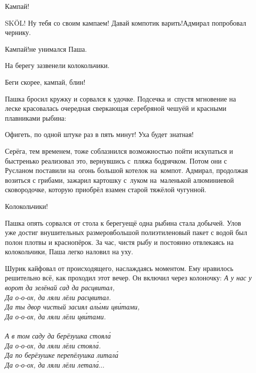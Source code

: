 \diagdash Кампай!

\diagdash SK{\"O}L! Ну тебя со своим кампаем! Давай компотик варить!\mdash Адмирал попробовал чернику.

\diagdash Кампай!\mdash не унимался Паша.

На берегу зазвенели колокольчики.

\diagdash Беги скорее, кампай, блин!

Пашка бросил кружку и сорвался к удочке. Подсечка и~спустя мгновение на леске красовалась очередная сверкающая серебряной чешуёй и красными плавниками рыбина:

\diagdash Офигеть, по одной штуке раз в пять минут! Уха будет знатная!

Серёга, тем временем, тоже соблазнился возможностью пойти искупаться и быстренько реализовал это, вернувшись с~пляжа бодрячком. Потом они с Русланом поставили на~огонь большой котелок на~компот. Адмирал, продолжая возиться с грибами, зажарил картошку с~луком на~маленькой алюминиевой сковородочке, которую приобрёл взамен старой тяжёлой чугунной. 

\diagdash Колокольчики!

Пашка опять сорвался от стола к берегу\mdash ещё одна рыбина стала добычей. Улов уже достиг внушительных размеров\mdash большой полиэтиленовый пакет с водой был полон плотвы и краснопёрок. За час, чистя рыбу и постоянно отвлекаясь на колокольчики, Паша легко наловил на уху.

Шурик кайфовал от происходящего, наслаждаясь моментом. Ему нравилось решительно всё, как проходил этот вечер. Он включил через колоночку:
\newpage
\vspace{0.2cm}
\noindent\textit{%
	\hspace*{1.5cm}А у нас у ворот да зелёнай сад да расцвитал,\\
	\hspace*{1.5cm}Да о-о-ох, да ляли лёли расцвитал.\\
	\hspace*{1.5cm}Да ты двор чистый засиял ал{\'ы}ми цв{\'и}тами,\\
	\hspace*{1.5cm}Да о-о-ох, да ляли лёли цв{\'и}тами.\\
	\\
	\hspace*{1.5cm}А в том саду да берёзушка стоял{\'а}\\
	\hspace*{1.5cm}Да о-о-ох, да ляли лёли стоял{\'а}.\\
	\hspace*{1.5cm}Да по берёзушке перепёлушка литал{\'а}\\
	\hspace*{1.5cm}Да о-о-ох, да ляли лёли летал{\'а}$\ldots$
}
\vspace{0.2cm}

